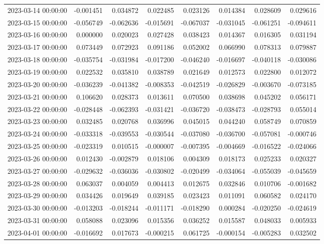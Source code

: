\begin{tabular}{lrrrrrrr}
2023-03-14 00:00:00 & -0.001451 & 0.034872 & 0.022485 & 0.023126 & 0.014384 & 0.028609 & 0.029616 \\
2023-03-15 00:00:00 & -0.056749 & -0.062636 & -0.015691 & -0.067037 & -0.031045 & -0.061251 & -0.094611 \\
2023-03-16 00:00:00 & 0.000000 & 0.020023 & 0.027428 & 0.038423 & 0.014367 & 0.016305 & 0.031194 \\
2023-03-17 00:00:00 & 0.073449 & 0.072923 & 0.091186 & 0.052002 & 0.066990 & 0.078313 & 0.079887 \\
2023-03-18 00:00:00 & -0.035754 & -0.031984 & -0.017200 & -0.046240 & -0.016697 & -0.040118 & -0.030086 \\
2023-03-19 00:00:00 & 0.022532 & 0.035810 & 0.038789 & 0.021649 & 0.012573 & 0.022800 & 0.012072 \\
2023-03-20 00:00:00 & -0.036239 & -0.041382 & -0.008353 & -0.042519 & -0.026829 & -0.003670 & -0.073185 \\
2023-03-21 00:00:00 & 0.106620 & 0.028373 & 0.013611 & 0.070500 & 0.038698 & 0.045202 & 0.056171 \\
2023-03-22 00:00:00 & -0.028448 & -0.062393 & -0.031421 & -0.036720 & -0.038473 & -0.028793 & 0.055014 \\
2023-03-23 00:00:00 & 0.032485 & 0.020768 & 0.036996 & 0.045015 & 0.044240 & 0.058749 & 0.070859 \\
2023-03-24 00:00:00 & -0.033318 & -0.039553 & -0.030544 & -0.037080 & -0.036700 & -0.057081 & -0.000746 \\
2023-03-25 00:00:00 & -0.023319 & 0.010515 & -0.000007 & -0.007395 & -0.004669 & -0.016522 & -0.024066 \\
2023-03-26 00:00:00 & 0.012430 & -0.002879 & 0.018106 & 0.004309 & 0.018173 & 0.025233 & 0.020327 \\
2023-03-27 00:00:00 & -0.029632 & -0.036036 & -0.030802 & -0.020499 & -0.034064 & -0.055039 & -0.045659 \\
2023-03-28 00:00:00 & 0.063037 & 0.004059 & 0.004413 & 0.012675 & 0.032846 & 0.010706 & -0.001682 \\
2023-03-29 00:00:00 & 0.034426 & 0.019649 & 0.039185 & 0.023423 & 0.011091 & 0.060582 & 0.024170 \\
2023-03-30 00:00:00 & -0.013203 & -0.018244 & -0.011171 & -0.018290 & 0.000284 & -0.020250 & -0.024619 \\
2023-03-31 00:00:00 & 0.058088 & 0.023096 & 0.015356 & 0.036252 & 0.015587 & 0.048033 & 0.005933 \\
2023-04-01 00:00:00 & -0.016692 & 0.017673 & -0.000215 & 0.061725 & -0.000154 & -0.005283 & 0.032502 \\

\end{tabular}
